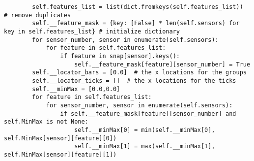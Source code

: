 \begin{verbatim}
        self.features_list = list(dict.fromkeys(self.features_list))  # remove duplicates
        self.__feature_mask = {key: [False] * len(self.sensors) for key in self.features_list} # initialize dictionary
        for sensor_number, sensor in enumerate(self.sensors):
            for feature in self.features_list:
                if feature in snap[sensor].keys():
                    self.__feature_mask[feature][sensor_number] = True
        self.__locator_bars = [0.0]  # the x locations for the groups
        self.__locator_ticks = []  # the x locations for the ticks
        self.__minMax = [0.0,0.0]
        for feature in self.features_list:        
            for sensor_number, sensor in enumerate(self.sensors):
                if self.__feature_mask[feature][sensor_number] and  self.MinMax is not None:                        
                    self.__minMax[0] = min(self.__minMax[0], self.MinMax[sensor][feature][0])
                    self.__minMax[1] = max(self.__minMax[1], self.MinMax[sensor][feature][1])
        

\end{verbatim}
